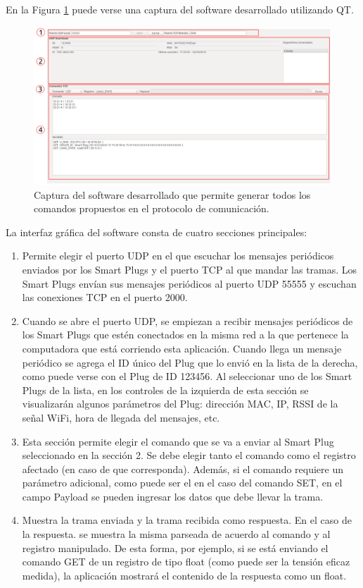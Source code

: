 En la Figura \ref{fig:simulador_tcp} puede verse una captura del software desarrollado utilizando QT.

\begin{figure}[h]
	\centering
	\includegraphics[width=14cm]{./Figures/4_1_2_simulador_tcp.png}
	\caption{Captura del software desarrollado que permite generar todos los comandos propuestos en el protocolo de comunicación.}
	\label{fig:simulador_tcp}
\end{figure}

La interfaz gráfica del software consta de cuatro secciones principales:

\begin{enumerate}
\item Permite elegir el puerto UDP en el que escuchar los mensajes periódicos enviados por los Smart Plugs y el puerto TCP al que mandar las tramas. Los Smart Plugs envían sus mensajes periódicos al puerto UDP 55555 y escuchan las conexiones TCP en el puerto 2000.

\item Cuando se abre el puerto UDP, se empiezan a recibir mensajes periódicos de los Smart Plugs que estén conectados en la misma red a la que pertenece la computadora que está corriendo esta aplicación. Cuando llega un mensaje periódico se agrega el ID único del Plug que lo envió en la lista de la derecha, como puede verse con el Plug de ID 123456. Al seleccionar uno de los Smart Plugs de la lista, en los controles de la izquierda de esta sección se visualizarán algunos parámetros del Plug: dirección MAC, IP, RSSI de la señal WiFi, hora de llegada del mensajes, etc.

\item Esta sección permite elegir el comando que se va a enviar al Smart Plug seleccionado en la sección 2. Se debe elegir tanto el comando como el registro afectado (en caso de que corresponda). Además, si el comando requiere un parámetro adicional, como puede ser el en el caso del comando SET, en el campo Payload se pueden ingresar los datos que debe llevar la trama.

\item Muestra la trama enviada y la trama recibida como respuesta. En el caso de la respuesta. se muestra la misma parseada de acuerdo al comando y al registro manipulado. De esta forma, por ejemplo, si se está enviando el comando GET de un registro de tipo float (como puede ser la tensión eficaz medida), la aplicación mostrará el contenido de la respuesta como un float.
\end{enumerate}

